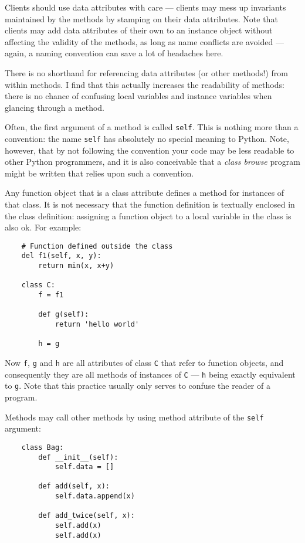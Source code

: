 \documentclass[UTF8]{article}
\begin{document}
Clients should use data attributes with care --- clients may mess up invariants maintained by the
methods by stamping on their data attributes. Note that clients may add data attributes of their
own to an instance object without affecting the validity of the methods, as long as name conflicts
are avoided --- again, a naming convention can save a lot of headaches here.

There is no shorthand for referencing data attributes (or other methods!) from within methods. I
find that this actually increases the readability of methods: there is no chance of confusing local
variables and instance variables when glancing through a method.

Often, the first argument of a method is called \texttt{self}. This is nothing more than a
convention: the name \texttt{self} has absolutely no special meaning to Python. Note, however, that
by not following the convention your code may be less readable to other Python programmers, and it
is also conceivable that a \emph{class browse} program might be written that relies upon such a
convention.

Any function object that is a class attribute defines a method for instances of that class. It is
not necessary that the function definition is textually enclosed in the class definition: assigning
a function object to a local variable in the class is also ok. For example:
\begin{verbatim}
    # Function defined outside the class
    del f1(self, x, y):
        return min(x, x+y)

    class C:
        f = f1

        def g(self):
            return 'hello world'

        h = g
\end{verbatim}
Now \texttt{f}, \texttt{g} and \texttt{h} are all attributes of class \texttt{C} that refer to
function objects, and consequently they are all methods of instances of \texttt{C} --- \texttt{h}
being exactly equivalent to \texttt{g}. Note that this practice usually only serves to confuse the
reader of a program.

Methods may call other methods by using method attribute of the \texttt{self} argument:
\begin{verbatim}
    class Bag:
        def __init__(self):
            self.data = []

        def add(self, x):
            self.data.append(x)

        def add_twice(self, x):
            self.add(x)
            self.add(x)
\end{verbatim}
\end{document}
